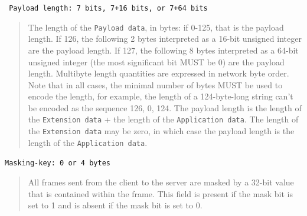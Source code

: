 \documentclass[a4paper, justified, notoc]{tufte-handout} %
\begin{document}
\noindent \texttt{   Payload length:  7 bits, 7+16 bits, or 7+64 bits}
\begin{quote}

	  The length of the \texttt{Payload data}, in bytes: if 0-125, that is the
      payload length.  If 126, the following 2 bytes interpreted as a
      16-bit unsigned integer are the payload length.  If 127, the
      following 8 bytes interpreted as a 64-bit unsigned integer (the
      most significant bit MUST be 0) are the payload length.  Multibyte
      length quantities are expressed in network byte order.  Note that
      in all cases, the minimal number of bytes MUST be used to encode
      the length, for example, the length of a 124-byte-long string
      can't be encoded as the sequence 126, 0, 124.  The payload length
      is the length of the \texttt{Extension data} + the length of the
      \texttt{Application data}.  The length of the \texttt{Extension data} may be
      zero, in which case the payload length is the length of the
      \texttt{Application data}.
\end{quote}


\noindent   \texttt{Masking-key:  0 or 4 bytes}
\begin{quote}
      All frames sent from the client to the server are masked by a
      32-bit value that is contained within the frame.  This field is
      present if the mask bit is set to 1 and is absent if the mask bit
      is set to 0. 
\end{quote}
\end{document}
